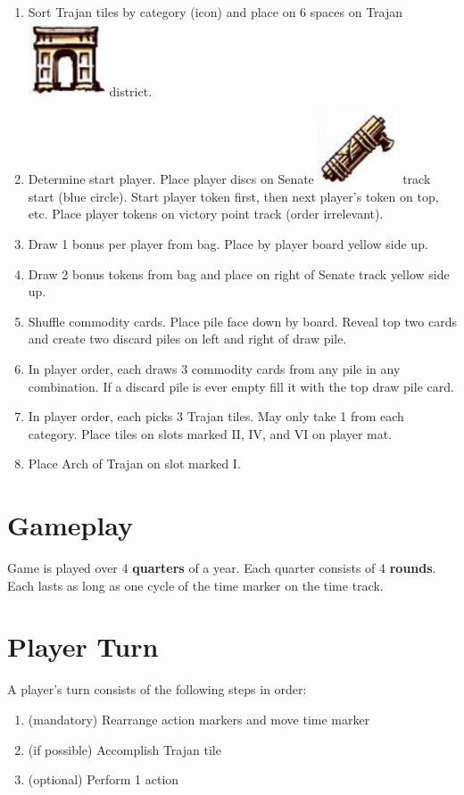 \documentclass[10pt]{article}
\newenvironment{enumerateCustom}
{\begin{enumerate}
  \setlength{\itemsep}{1pt}
  \setlength{\parskip}{0pt}
  \setlength{\parsep}{0pt}}
{\end{enumerate}}
\begin{document}
\begin{multicols*}{2}
\begin{enumerateCustom}
        \item Sort Trajan tiles by category (icon) and place on 6 spaces on Trajan \protect\includegraphics[scale=0.2]{images/trajan.jpg} district.
        \item Determine start player. Place player discs on Senate \protect\includegraphics[scale=0.2]{images/senate.jpg} track start (blue circle). Start player token first, then next player's token on top, etc. Place player tokens on victory point track (order irrelevant).
        \item Draw 1 bonus per player from bag. Place by player board yellow side up.
        \item Draw 2 bonus tokens from bag and place on right of Senate track yellow side up.
        \item Shuffle commodity cards. Place pile face down by board. Reveal top two cards and create two discard piles on left and right of draw pile.
        \item In player order, each draws 3 commodity cards from any pile in any combination. If a discard pile is ever empty fill it with the top draw pile card.
        \item In player order, each picks 3 Trajan tiles. May only take 1 from each category. Place tiles on slots marked II, IV, and VI on player mat.
        \item Place Arch of Trajan on slot marked I.
    \end{enumerateCustom}

\section*{Gameplay}
Game is played over 4 \textbf{quarters} of a year. Each quarter consists of 4 \textbf{rounds}. Each lasts as long as one cycle of the time marker on the time track.

\section*{Player Turn}
A player's turn consists of the following steps in order:
    \begin{enumerateCustom}
        \item (mandatory) Rearrange action markers and move time marker
        \item (if possible) Accomplish Trajan tile
        \item (optional) Perform 1 action
    \end{enumerateCustom}


\end{multicols*}
\end{document}
